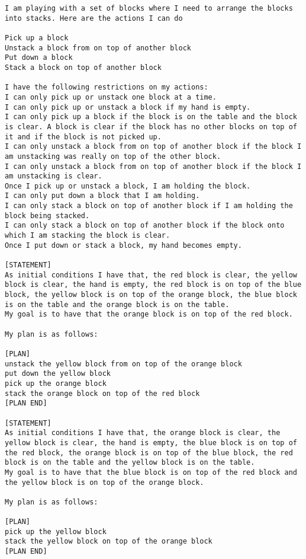 \begin{lstlisting}[breaklines=true,breakatwhitespace=true]
I am playing with a set of blocks where I need to arrange the blocks into stacks. Here are the actions I can do

Pick up a block
Unstack a block from on top of another block
Put down a block
Stack a block on top of another block

I have the following restrictions on my actions:
I can only pick up or unstack one block at a time.
I can only pick up or unstack a block if my hand is empty.
I can only pick up a block if the block is on the table and the block is clear. A block is clear if the block has no other blocks on top of it and if the block is not picked up.
I can only unstack a block from on top of another block if the block I am unstacking was really on top of the other block.
I can only unstack a block from on top of another block if the block I am unstacking is clear.
Once I pick up or unstack a block, I am holding the block.
I can only put down a block that I am holding.
I can only stack a block on top of another block if I am holding the block being stacked.
I can only stack a block on top of another block if the block onto which I am stacking the block is clear.
Once I put down or stack a block, my hand becomes empty.

[STATEMENT]
As initial conditions I have that, the red block is clear, the yellow block is clear, the hand is empty, the red block is on top of the blue block, the yellow block is on top of the orange block, the blue block is on the table and the orange block is on the table.
My goal is to have that the orange block is on top of the red block.

My plan is as follows:

[PLAN]
unstack the yellow block from on top of the orange block
put down the yellow block
pick up the orange block
stack the orange block on top of the red block
[PLAN END]

[STATEMENT]
As initial conditions I have that, the orange block is clear, the yellow block is clear, the hand is empty, the blue block is on top of the red block, the orange block is on top of the blue block, the red block is on the table and the yellow block is on the table.
My goal is to have that the blue block is on top of the red block and the yellow block is on top of the orange block.

My plan is as follows:

[PLAN]
pick up the yellow block
stack the yellow block on top of the orange block
[PLAN END]


\end{lstlisting}
